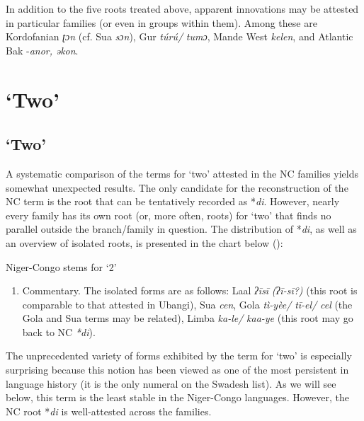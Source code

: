 In addition to the five roots treated above, apparent innovations may be attested in particular families (or even in groups within them). Among these are Kordofanian \textit{ʈɔn} (cf. Sua \textit{sɔn}), Gur \textit{t{\'{u}}r{\'{u}}/} \textit{tumɔ}, Mande West \textit{kelen}, and Atlantic Bak -\textit{anor,} \textit{əkon}.

\clearpage
\section{‘Two’}%

\subsection{‘Two’}%
A systematic comparison of the terms for ‘two’ attested in the NC families yields somewhat unexpected results. The only candidate for the reconstruction of the NC term is the root that can be tentatively recorded as *\textit{di}. However, nearly every family has its own root (or, more often, roots) for ‘two’ that finds no parallel outside the branch/family in question. The distribution of *\textit{di}, as well as an overview of isolated roots, is presented in the chart below ():

\begin{table}
\caption{\label{tab:4:2}Niger-Congo stems for `2'}
\kppyramid



\end{table}
\begin{enumerate}
\item Commentary. The isolated forms are as follows: Laal \textit{ʔ{\={i}}s{\={i}}} \textit{(ʔ{\={i}}-s{\={i}}?)} (this root is comparable to that attested in Ubangi), Sua \textit{cen}, Gola \textit{tì-yèe/} \textit{t{\={i}}-el/} \textit{cel}  (the Gola and Sua terms may be related), Limba \textit{ka-le/} \textit{kaa-ye} (this root may go back to NC \textit{*di}). 
\end{enumerate}
The unprecedented variety of forms exhibited by the term for ‘two’ is especially surprising because this notion has been viewed as one of the most persistent in language history (it is the only numeral on the Swadesh list). As we will see below, this term is the least stable in the Niger-Congo languages. However, the NC root *\textit{di} is well-attested across the families.

